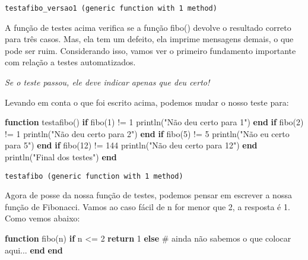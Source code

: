 \documentclass[
  letterpaper,
  DIV=11,
  numbers=noendperiod]{scrreprt}
\newenvironment{Shaded}{\begin{snugshade}}{\end{snugshade}}
\newcommand{\CommentTok}[1]{\textcolor[rgb]{0.37,0.37,0.37}{#1}}
\newcommand{\ControlFlowTok}[1]{\textcolor[rgb]{0.00,0.23,0.31}{\textbf{#1}}}
\newcommand{\FloatTok}[1]{\textcolor[rgb]{0.68,0.00,0.00}{#1}}
\newcommand{\FunctionTok}[1]{\textcolor[rgb]{0.28,0.35,0.67}{#1}}
\newcommand{\KeywordTok}[1]{\textcolor[rgb]{0.00,0.23,0.31}{\textbf{#1}}}
\newcommand{\NormalTok}[1]{\textcolor[rgb]{0.00,0.23,0.31}{#1}}
\newcommand{\OperatorTok}[1]{\textcolor[rgb]{0.37,0.37,0.37}{#1}}
\newcommand{\StringTok}[1]{\textcolor[rgb]{0.13,0.47,0.30}{#1}}
\begin{document}
\begin{verbatim}
testafibo_versao1 (generic function with 1 method)
\end{verbatim}

A função de testes acima verifica se a função fibo() devolve o resultado
correto para três casos. Mas, ela tem um defeito, ela imprime mensagens
demais, o que pode ser ruim. Considerando isso, vamos ver o primeiro
fundamento importante com relação a testes automatizados.

\emph{Se o teste passou, ele deve indicar apenas que deu certo!}

Levando em conta o que foi escrito acima, podemos mudar o nosso teste
para:

\begin{Shaded}
\begin{Highlighting}[]
\KeywordTok{function} \FunctionTok{testafibo}\NormalTok{()}
  \ControlFlowTok{if} \FunctionTok{fibo}\NormalTok{(}\FloatTok{1}\NormalTok{) }\OperatorTok{!=} \FloatTok{1}
    \FunctionTok{println}\NormalTok{(}\StringTok{"Não deu certo para 1"}\NormalTok{)}
  \ControlFlowTok{end}
  \ControlFlowTok{if} \FunctionTok{fibo}\NormalTok{(}\FloatTok{2}\NormalTok{) }\OperatorTok{!=} \FloatTok{1}
    \FunctionTok{println}\NormalTok{(}\StringTok{"Não deu certo para 2"}\NormalTok{)}
  \ControlFlowTok{end}
  \ControlFlowTok{if} \FunctionTok{fibo}\NormalTok{(}\FloatTok{5}\NormalTok{) }\OperatorTok{!=} \FloatTok{5}
    \FunctionTok{println}\NormalTok{(}\StringTok{"Não eu certo para 5"}\NormalTok{)}
  \ControlFlowTok{end}
  \ControlFlowTok{if} \FunctionTok{fibo}\NormalTok{(}\FloatTok{12}\NormalTok{) }\OperatorTok{!=} \FloatTok{144}
    \FunctionTok{println}\NormalTok{(}\StringTok{"Não deu certo para 12"}\NormalTok{)}
  \ControlFlowTok{end}
  \FunctionTok{println}\NormalTok{(}\StringTok{"Final dos testes"}\NormalTok{)}
\KeywordTok{end}
\end{Highlighting}
\end{Shaded}

\begin{verbatim}
testafibo (generic function with 1 method)
\end{verbatim}

Agora de posse da nossa função de testes, podemos pensar em escrever a
nossa função de Fibonacci. Vamos ao caso fácil de n for menor que 2, a
resposta é 1. Como vemos abaixo:

\begin{Shaded}
\begin{Highlighting}[]
\KeywordTok{function} \FunctionTok{fibo}\NormalTok{(n)}
    \ControlFlowTok{if}\NormalTok{ n }\OperatorTok{\textless{}=} \FloatTok{2}
        \ControlFlowTok{return} \FloatTok{1}
    \ControlFlowTok{else}
        \CommentTok{\# ainda não sabemos o que colocar aqui...}
    \ControlFlowTok{end}
\KeywordTok{end}
\end{Highlighting}
\end{Shaded}
\end{document}

